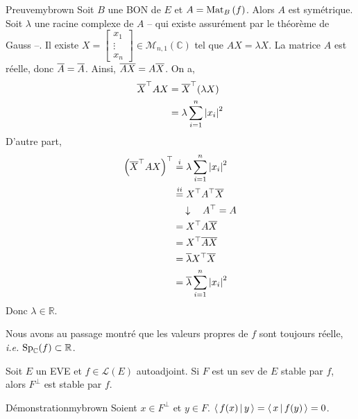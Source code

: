     \begin{demo}{Preuve}{mybrown}
        Soit $B$ une BON de $E$ et $A = \text{Mat}_{B}\left(f\right)$. Alors $A$ est symétrique. Soit $\lambda$ une racine complexe de $A$ -- qui existe assurément par le théorème de Gauss --. Il existe $X  = \begin{bmatrix}
        x_1 \\
        \vdots \\
        x_n
        \end{bmatrix}\in \mathcal{M}_{n,1}(\mathbb{C})$ tel que $AX = \lambda X$. La matrice $A$ est réelle, donc $\overline{A} = \overline{A}$. Ainsi, $\overline{AX} = A \overline{X}$. On a,
        \begin{align*}
            \overline{X}^{\top} A X 
            &= \overline{X}^{\top} (\lambda X) \\
            &= \lambda \sum_{i=1}^{n} \left\lvert x_i\right\rvert^2
        \end{align*}
        D’autre part, 
        \begin{align*}
            \left(\overline{X}^{\top} A X \right)^{\top} &\overset{i}{=} \lambda \sum_{i=1}^{n} \left\lvert x_i\right\rvert^2 \\
            &\overset{ii}{=} X^{\top} A^{\top} \overline{X} \\
            & \quad \downarrow \quad A^{\top} = A \\
            &= X^{\top} A \overline{X} \\
            &= X^{\top} \overline{AX} \\
            &= \overline{\lambda} X^{\top} \overline{X} \\
            &= \overline{\lambda} \sum_{i=1}^{n} \left\lvert x_i\right\rvert^2
        \end{align*}
        Donc $\lambda \in \mathbb{R}$.
    \end{demo}

    Nous avons au passage montré que les valeurs propres de $f$ sont toujours réelle, \textit{i.e.} $\operatorname{Sp}_{\mathbb{C}}(f) \subset \mathbb{R}$.

    \begin{lem}{}{}
        Soit $E$ un EVE et $f \in \mathcal{L}(E)$ autoadjoint. Si $F$ est un sev de $E$ stable par $f$, alors $F^{\perp}$ est stable par $f$. 
    \end{lem}

    \begin{demo}{Démonstration}{mybrown}
        Soient $x \in F^{\perp}$ et $y \in F$. $\left<\,f(x)\,\middle|\,y\,\right> = \left<\,x\,\middle|\,f(y)\,\right> = 0$.
    \end{demo}

